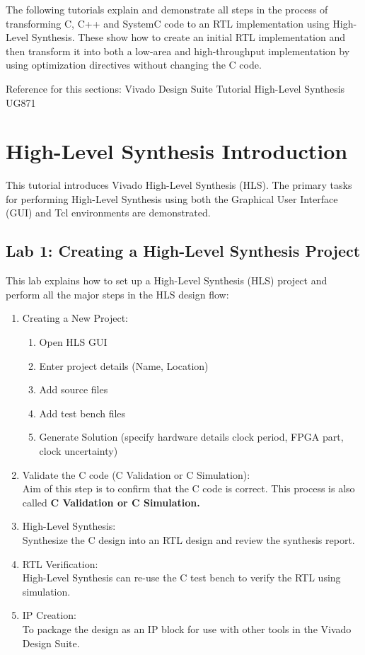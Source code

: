 The following tutorials explain and demonstrate all
steps in the process of transforming C, C++ and SystemC code to an RTL implementation
using High-Level Synthesis. These show how to create an initial RTL implementation
and then transform it into both a low-area and high-throughput implementation by
using optimization directives without changing the C code. 

\begin{highlight}
Reference for this sections: Vivado Design Suite Tutorial High-Level Synthesis UG871
\end{highlight}


\section{High-Level Synthesis Introduction}
This tutorial introduces Vivado High-Level Synthesis (HLS). The primary
tasks for performing High-Level Synthesis using both the Graphical User Interface (GUI) and
Tcl environments are demonstrated.

\subsection{Lab 1: Creating a High-Level Synthesis Project}
This lab explains how to set up a High-Level Synthesis (HLS) project and perform all the major steps in the HLS design flow:

\begin{enumerate}[label=Step \arabic*:]
    \item Creating a New Project: 
    \begin{enumerate}
        \item Open HLS GUI
        \item Enter project details (Name, Location)
        \item Add source files
        \item Add test bench files
        \item Generate Solution (specify hardware details \eg clock period, FPGA part, clock uncertainty)
    \end{enumerate}    
    \item Validate the C code (C Validation or C Simulation):\\
    Aim of this step is to confirm that the C code is correct. This process is also called {\bf C Validation or C Simulation.}
    \item High-Level Synthesis:\\ Synthesize the C design into an RTL design and review the synthesis report.
    \item RTL Verification:\\ High-Level Synthesis can re-use the C test bench to verify the RTL using simulation.
    \item IP Creation:\\ To package the design as an IP block for
    use with other tools in the Vivado Design Suite.
\end{enumerate}



